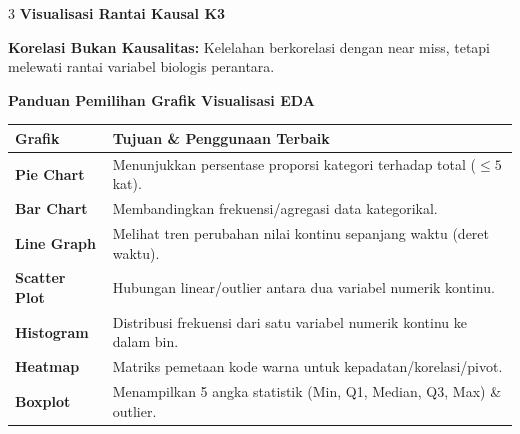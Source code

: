 \documentclass[6.8pt,landscape,a4paper]{extarticle}
\newcommand{\sdtSub}[1]{%
    \vspace{0.5pt}%
    \noindent\textbf{\fontsize{5.8pt}{6.8pt}\selectfont\color{sdtBlue}#1}\vspace{0.1pt}%
}
\begin{document}
\begin{multicols}{3}
\sdtSub{Visualisasi Rantai Kausal K3}
\begin{center}
\end{center}
\textbf{Korelasi Bukan Kausalitas:} Kelelahan berkorelasi dengan near miss, tetapi melewati rantai variabel biologis perantara.

\sdtSub{Panduan Pemilihan Grafik Visualisasi EDA}
\begin{center}
{\fontsize{4.8pt}{5.8pt}\selectfont
\begin{tabularx}{\linewidth}{@{}lX@{}}
\toprule
\textbf{Grafik} & \textbf{Tujuan \& Penggunaan Terbaik} \\
\midrule
\textbf{Pie Chart} & Menunjukkan persentase proporsi kategori terhadap total ($\leq 5$ kat). \\
\textbf{Bar Chart} & Membandingkan frekuensi/agregasi data kategorikal. \\
\textbf{Line Graph} & Melihat tren perubahan nilai kontinu sepanjang waktu (deret waktu). \\
\textbf{Scatter Plot} & Hubungan linear/outlier antara dua variabel numerik kontinu. \\
\textbf{Histogram} & Distribusi frekuensi dari satu variabel numerik kontinu ke dalam bin. \\
\textbf{Heatmap} & Matriks pemetaan kode warna untuk kepadatan/korelasi/pivot. \\
\textbf{Boxplot} & Menampilkan 5 angka statistik (Min, Q1, Median, Q3, Max) \& outlier. \\
\bottomrule
\end{tabularx}}
\end{center}


\end{multicols}
\end{document}
